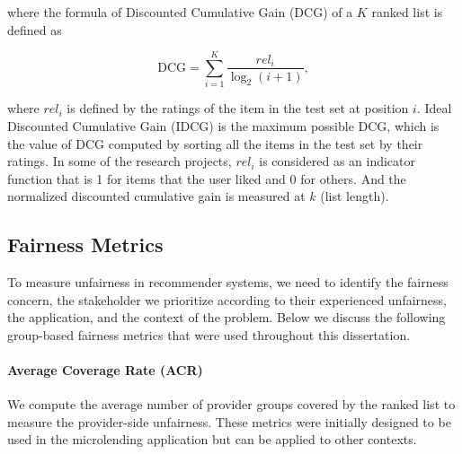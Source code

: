             where the formula of Discounted Cumulative Gain (DCG) of a $K$ ranked list is defined as
            
            \begin{equation}
            \text{DCG}=\sum_{i=1}^K\frac{{rel}_i}{\log_2(i+1)},
            \end{equation}
            \vspace{0.25cm}
            
            where ${rel}_i$ is defined by the ratings of the item in the test set at position $i$. Ideal Discounted Cumulative Gain (IDCG) is the maximum possible DCG, which is the value of DCG computed by sorting all the items in the test set by their ratings. In some of the research projects, ${rel}_i$ is considered as an indicator function that is 1 for items that the user liked and 0 for others. And the normalized discounted cumulative gain is measured at $k$ (list length).
        
    \subsection{Fairness Metrics}
    
        To measure unfairness in recommender systems, we need to identify the fairness concern, the stakeholder we prioritize according to their experienced unfairness, the application, and the context of the problem. Below we discuss the following group-based fairness metrics that were used throughout this dissertation.
        
        
        \vspace{0.25cm}
        \noindent \paragraph{Average Coverage Rate (ACR)}
        \vspace{0.25cm}
        
            We compute the average number of provider groups covered by the ranked list to measure the provider-side unfairness. These metrics were initially designed to be used in the microlending application but can be applied to other contexts.
        

